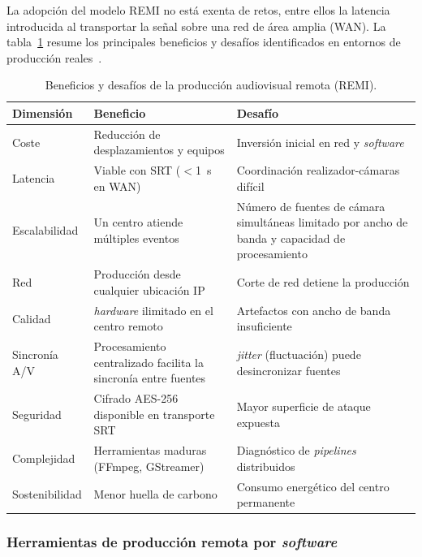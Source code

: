 La adopción del modelo REMI no está exenta de retos, entre ellos la latencia introducida
al transportar la señal sobre una red de área amplia (\ac{WAN}). La tabla~\ref{tab:remi_beneficios_desafios}
resume los principales beneficios y desafíos identificados en entornos de producción
reales~\cite{tmbroadcast_remi}.

\begin{table}[H]
  \centering
  \caption{Beneficios y desafíos de la producción audiovisual remota (REMI).}
  \label{tab:remi_beneficios_desafios}
  \small
  \begin{tabularx}{\textwidth}{|l|X|X|}
    \hline
    \textbf{Dimensión} & \textbf{Beneficio} & \textbf{Desafío} \\
    \hline
    Coste           & Reducción de desplazamientos y equipos    & Inversión inicial en red y \textit{software} \\
    Latencia        & Viable con SRT ($<$1~s en WAN)  & Coordinación realizador-cámaras difícil \\
    Escalabilidad   & Un centro atiende múltiples eventos       & Número de fuentes de cámara simultáneas limitado por ancho de banda y capacidad de procesamiento \\
    Red             & Producción desde cualquier ubicación IP   & Corte de red detiene la producción \\
    Calidad         & \textit{hardware} ilimitado en el centro remoto    & Artefactos con ancho de banda insuficiente \\
    Sincronía A/V   & Procesamiento centralizado facilita la sincronía entre fuentes & \textit{jitter} (fluctuación) puede desincronizar fuentes \\
    Seguridad       & Cifrado AES-256 disponible en transporte SRT & Mayor superficie de ataque expuesta \\
    Complejidad     & Herramientas maduras (FFmpeg, GStreamer)   & Diagnóstico de \textit{pipelines} distribuidos \\
    Sostenibilidad  & Menor huella de carbono                   & Consumo energético del centro permanente \\
    \hline
  \end{tabularx}
\end{table}

\subsubsection*{Herramientas de producción remota por \textit{software}}

